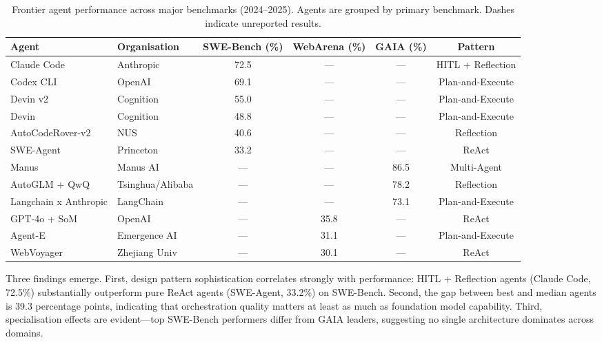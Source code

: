\documentclass[sn-basic]{sn-jnl}
\theoremstyle{definition}
\begin{document}
\begin{table}[ht]
\centering
\caption{Frontier agent performance across major benchmarks (2024--2025). Agents are grouped by primary benchmark. Dashes indicate unreported results.}
\label{tab:benchmarks}
\begin{tabular}{llcccc}
\toprule
\textbf{Agent} & \textbf{Organisation} & \textbf{SWE-Bench (\%)} & \textbf{WebArena (\%)} & \textbf{GAIA (\%)} & \textbf{Pattern} \\
\midrule
Claude Code         & Anthropic      & 72.5 & ---  & ---  & HITL + Reflection \\
Codex CLI           & OpenAI         & 69.1 & ---  & ---  & Plan-and-Execute \\
Devin v2            & Cognition      & 55.0 & ---  & ---  & Plan-and-Execute \\
Devin               & Cognition      & 48.8 & ---  & ---  & Plan-and-Execute \\
AutoCodeRover-v2    & NUS            & 40.6 & ---  & ---  & Reflection \\
SWE-Agent           & Princeton      & 33.2 & ---  & ---  & ReAct \\
Manus               & Manus AI       & ---  & ---  & 86.5 & Multi-Agent \\
AutoGLM + QwQ       & Tsinghua/Alibaba & --- & ---  & 78.2 & Reflection \\
Langchain x Anthropic & LangChain    & ---  & ---  & 73.1 & Plan-and-Execute \\
GPT-4o + SoM        & OpenAI         & ---  & 35.8 & ---  & ReAct \\
Agent-E             & Emergence AI   & ---  & 31.1 & ---  & Plan-and-Execute \\
WebVoyager          & Zhejiang Univ  & ---  & 30.1 & ---  & ReAct \\
\bottomrule
\end{tabular}
\end{table}

Three findings emerge. First, design pattern sophistication correlates strongly with performance: HITL + Reflection agents (Claude Code, 72.5\%) substantially outperform pure ReAct agents (SWE-Agent, 33.2\%) on SWE-Bench. Second, the gap between best and median agents is 39.3 percentage points, indicating that orchestration quality matters at least as much as foundation model capability. Third, specialisation effects are evident---top SWE-Bench performers differ from GAIA leaders, suggesting no single architecture dominates across domains.
\end{document}
